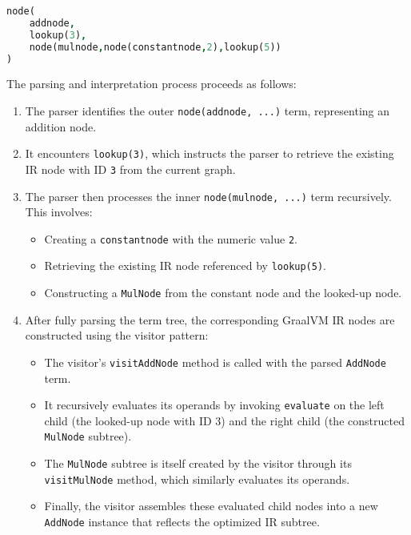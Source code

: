\begin{lstlisting}[language=Prolog]
node(
    addnode,
    lookup(3),
    node(mulnode,node(constantnode,2),lookup(5))
)
\end{lstlisting}

The parsing and interpretation process proceeds as follows:

\begin{enumerate}
    \item The parser identifies the outer \texttt{node(addnode, ...)} term, representing an addition node.
    \item It encounters \texttt{lookup(3)}, which instructs the parser to retrieve the existing IR node with ID \texttt{3} from the current graph.
    \item The parser then processes the inner \texttt{node(mulnode, ...)} term recursively. This involves:
    \begin{itemize}
        \item Creating a \texttt{constantnode} with the numeric value \texttt{2}.
        \item Retrieving the existing IR node referenced by \texttt{lookup(5)}.
        \item Constructing a \texttt{MulNode} from the constant node and the looked-up node.
    \end{itemize}
    \item After fully parsing the term tree, the corresponding GraalVM IR nodes are constructed using the visitor pattern:
    \begin{itemize}
        \item The visitor’s \texttt{visitAddNode} method is called with the parsed \texttt{AddNode} term.
        \item It recursively evaluates its operands by invoking \texttt{evaluate} on the left child (the looked-up node with ID 3) and the right child (the constructed \texttt{MulNode} subtree).
        \item The \texttt{MulNode} subtree is itself created by the visitor through its \texttt{visitMulNode} method, which similarly evaluates its operands.
        \item Finally, the visitor assembles these evaluated child nodes into a new \texttt{AddNode} instance that reflects the optimized IR subtree.
    \end{itemize}
\end{enumerate}
